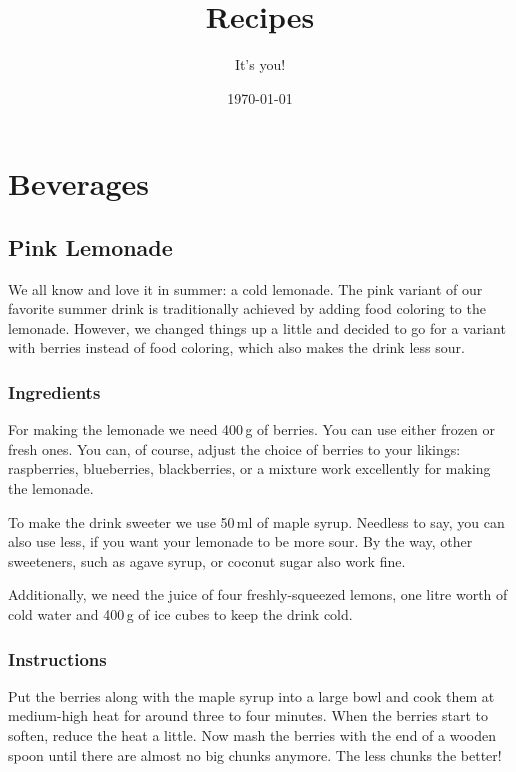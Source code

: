 \documentclass[twocolumn]{article}
\title{Recipes}
\date{\today}
\author{It's you!}
\begin{document}
\pagestyle{fancy} %
\thispagestyle{fancy} %

\fancyhead{}

\fancyfoot{}
\fancyfoot[R]{\thepage}

\maketitle
{}

\tableofcontents
	
\section{Beverages}
	
\subsection{Pink Lemonade}
We all know and love it in summer: a cold lemonade. The pink variant of our  favorite summer drink is traditionally achieved by adding food coloring to the lemonade. 
However, we changed things up a little and decided to go for a variant with berries instead of food coloring, which also makes the drink less sour.
	
\subsubsection{Ingredients}
For making the lemonade we need 400\,g of berries. You can use either frozen or fresh ones. You can, of course, adjust the choice of berries to your likings: raspberries, blueberries, blackberries, or a mixture work excellently for making the lemonade.

To make the drink sweeter we use 50\,ml of maple syrup. Needless to say, you can also use less, if you want your lemonade to be more sour. By the way, other sweeteners, such as agave syrup, or coconut sugar also work fine.

Additionally, we need the juice of four freshly-squeezed lemons, one litre worth of cold water and 400\,g of ice cubes to keep the drink cold.
	
\subsubsection{Instructions}
Put the berries along with the maple syrup into a large bowl and cook them at medium-high heat for around three to four minutes. When the berries start to soften, reduce the heat a little. Now mash the berries with the end of a wooden spoon until there are almost no big chunks anymore. The less chunks the better!
	
\end{document}
